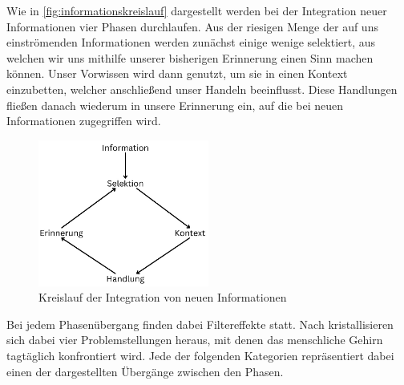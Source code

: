 Wie in \autoref{fig:informationskreislauf} dargestellt werden bei der Integration neuer Informationen vier Phasen durchlaufen.
Aus der riesigen Menge der auf uns einströmenden Informationen werden zunächst einige wenige selektiert, aus welchen wir uns mithilfe unserer bisherigen Erinnerung einen Sinn machen können.
Unser Vorwissen wird dann genutzt, um sie in einen Kontext einzubetten, welcher anschließend unser Handeln beeinflusst.
Diese Handlungen fließen danach wiederum in unsere Erinnerung ein, auf die bei neuen Informationen zugegriffen wird.

\begin{figure}[h!]
	\centering
	\includegraphics[width=0.5\textwidth]{resources/informationskreislauf.jpg}
	\caption{Kreislauf der Integration von neuen Informationen}
	\label{fig:informationskreislauf}
\end{figure}

Bei jedem Phasenübergang finden dabei Filtereffekte statt.
Nach \cite{benson2016cognitive} kristallisieren sich dabei vier Problemstellungen heraus, mit denen das menschliche Gehirn tagtäglich konfrontiert wird.
Jede der folgenden Kategorien repräsentiert dabei einen der dargestellten Übergänge zwischen den Phasen.

